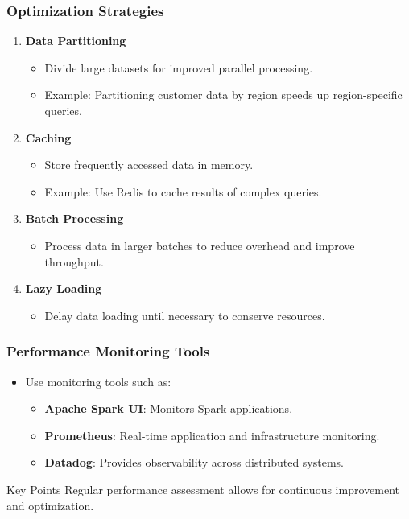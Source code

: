 \documentclass{beamer}
\begin{document}
\begin{frame}[fragile]
    \frametitle{Optimization Strategies}
    \begin{enumerate}
        \item \textbf{Data Partitioning}
        \begin{itemize}
            \item Divide large datasets for improved parallel processing.
            \item Example: Partitioning customer data by region speeds up region-specific queries.
        \end{itemize}
        
        \item \textbf{Caching}
        \begin{itemize}
            \item Store frequently accessed data in memory.
            \item Example: Use Redis to cache results of complex queries.
        \end{itemize}
        
        \item \textbf{Batch Processing}
        \begin{itemize}
            \item Process data in larger batches to reduce overhead and improve throughput.
        \end{itemize}
        
        \item \textbf{Lazy Loading}
        \begin{itemize}
            \item Delay data loading until necessary to conserve resources.
        \end{itemize}
    \end{enumerate}
\end{frame}

\begin{frame}[fragile]
    \frametitle{Performance Monitoring Tools}
    \begin{itemize}
        \item Use monitoring tools such as:
        \begin{itemize}
            \item \textbf{Apache Spark UI}: Monitors Spark applications.
            \item \textbf{Prometheus}: Real-time application and infrastructure monitoring.
            \item \textbf{Datadog}: Provides observability across distributed systems.
        \end{itemize}
    \end{itemize}
    \begin{block}{Key Points}
        Regular performance assessment allows for continuous improvement and optimization.
    \end{block}
\end{frame}
\end{document}
